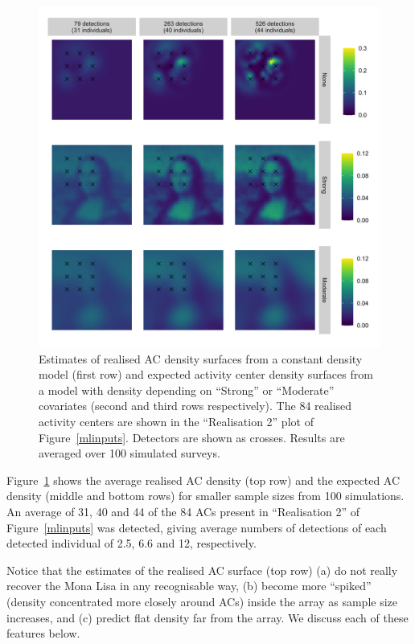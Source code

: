 \documentclass[10pt,a4paper]{article}
\begin{document}
\begin{figure}[htbp]
\centering
\includegraphics[width=1\textwidth]{mona_peaky_avgd.png}
\caption{Estimates of realised AC density surfaces from a constant density model (first row) and expected activity center density surfaces from a model with density depending on ``Strong'' or ``Moderate'' covariates (second and third rows respectively). The 84 realised activity centers are shown in the ``Realisation 2'' plot of Figure~\ref{mlinputs}. Detectors are shown as crosses. Results are averaged over 100 simulated surveys.}
\label{mona_peaky_avgd}
\end{figure}

Figure~\ref{mona_peaky_avgd} shows the average realised AC density (top row) and the expected AC density (middle and bottom rows) for smaller sample sizes  from 100 simulations. An average of 31, 40 and 44 of the 84 ACs present in ``Realisation 2'' of Figure~\ref{mlinputs} was detected, giving average numbers of detections of each detected individual of 2.5, 6.6 and 12, respectively.

Notice that the estimates of the realised AC surface (top row) (a) do not really recover the Mona Lisa in any recognisable way, (b) become more ``spiked'' (density concentrated more closely around ACs) inside the array as sample size increases, and (c) predict flat density far from the array. We discuss each of these features below.
\end{document}
